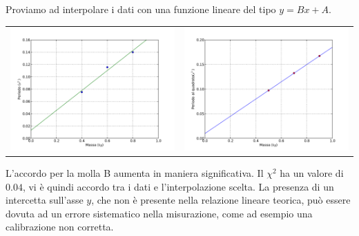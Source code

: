 Proviamo ad interpolare i dati con una funzione lineare del tipo $y = Bx+A$. 
\begin{center}
\begin{tabular}{c c}
\includegraphics[scale=0.4]{../grafici/molla/mollaAsecondo.pdf}&\hspace{1cm}\includegraphics[scale=0.4]{../grafici/molla/mollaBsecondo.pdf}\\

\end{tabular}
\end{center}

L'accordo per la molla B aumenta in maniera significativa. Il $\chi^2$ ha un valore di $0.04$, vi è quindi accordo tra i dati e l'interpolazione scelta.
La presenza di un intercetta sull'asse $y$, che non è presente nella relazione lineare teorica, può essere dovuta ad un errore sistematico nella misurazione, come ad esempio una  calibrazione non corretta. 

